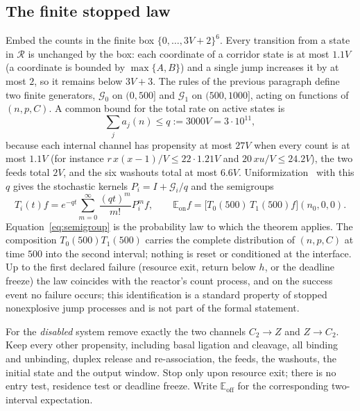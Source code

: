 \documentclass[11pt,a4paper]{article}
\theoremstyle{plain}
\theoremstyle{definition}
\theoremstyle{remark}
\newcommand{\E}{\mathbb E}
\newcommand{\G}{\mathcal G}
\newcommand{\R}{\mathcal R}
\begin{document}
\subsection{The finite stopped law}

Embed the counts in the finite box $\{0,\dots,3V+2\}^6$. Every transition from a state in $\R$ is unchanged by the box: each coordinate of a corridor state is at most $1.1V$ (a coordinate is bounded by $\max\{A,B\}$) and a single jump increases it by at most $2$, so it remains below $3V+3$. The rules of the previous paragraph define two finite generators, $\G_0$ on $(0,500]$ and $\G_1$ on $(500,1000]$, acting on functions of $(n,p,C)$. A common bound for the total rate on active states is
\begin{equation}\label{eq:q}
\sum_j a_j(n)\le q:=3000V=3\cdot10^{11},
\end{equation}
because each internal channel has propensity at most $27V$ when every count is at most $1.1V$ (for instance $r\,x(x-1)/V\le 22\cdot1.21V$ and $20\,xu/V\le 24.2V$), the two feeds total $2V$, and the six washouts total at most $6.6V$. Uniformization~\citep{jensen1953,grassmann1977} with this $q$ gives the stochastic kernels $P_i=I+\G_i/q$ and the semigroups
\begin{equation}\label{eq:semigroup}
T_i(t)f=e^{-qt}\sum_{m=0}^{\infty}\frac{(qt)^m}{m!}P_i^mf,\qquad
\E_{\mathrm{on}}f=\bigl[T_0(500)\,T_1(500)f\bigr](n_0,0,0).
\end{equation}
Equation~\eqref{eq:semigroup} is the probability law to which the theorem applies. The composition $T_0(500)T_1(500)$ carries the complete distribution of $(n,p,C)$ at time $500$ into the second interval; nothing is reset or conditioned at the interface. Up to the first declared failure (resource exit, return below $h$, or the deadline freeze) the law coincides with the reactor's count process, and on the success event no failure occurs; this identification is a standard property of stopped nonexplosive jump processes and is not part of the formal statement.

For the \emph{disabled} system remove exactly the two channels $C_2\to Z$ and $Z\to C_2$. Keep every other propensity, including basal ligation and cleavage, all binding and unbinding, duplex release and re-association, the feeds, the washouts, the initial state and the output window. Stop only upon resource exit; there is no entry test, residence test or deadline freeze. Write $\E_{\mathrm{off}}$ for the corresponding two-interval expectation.
\end{document}
